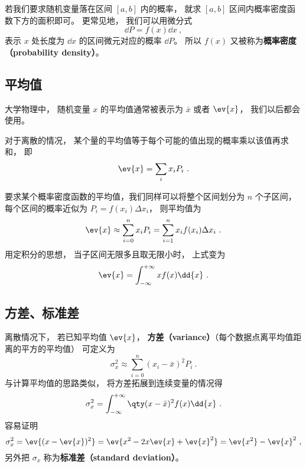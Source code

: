 若我们要求随机变量落在区间 $[a,b]$ 内的概率， 就求 $[a,b]$ 区间内概率密度函数下方的面积即可。 更常见地， 我们可以用微分式
\begin{equation}
\dd{P} = f(x) \dd{x}~,
\end{equation}
表示 $x$ 处长度为 $\dd{x}$ 的区间微元对应的概率 $\dd{P}$。 所以 $f(x)$ 又被称为\textbf{概率密度（probability density）}。

\subsection{平均值}
大学物理中， 随机变量 $x$ 的平均值通常被表示为 $\bar x$ 或者 $\ev{x}$， 我们以后都会使用。

对于离散的情况， 某个量的平均值等于每个可能的值出现的概率乘以该值再求和， 即
\begin{equation}\label{eq_RandF_14}
\ev{x} = \sum_i x_i P_i~.
\end{equation}

要求某个概率密度函数的平均值，我们同样可以将整个区间划分为 $n$ 个子区间， 每个区间的概率近似为 $P_i = f(x_i) \Delta x_i$， 则平均值为
\begin{equation}
\ev{x} \approx \sum_{i=0}^n x_i P_i = \sum_{i=1}^n x_i f(x_i) \Delta x_i~.
\end{equation}
用定积分的思想， 当子区间无限多且取无限小时， 上式变为
\begin{equation}\label{eq_RandF_7}
\ev{x} = \int_{-\infty}^{+\infty} x f(x) \dd{x}~.
\end{equation}

\subsection{方差、标准差}
离散情况下， 若已知平均值 $\ev{x}$， \textbf{方差（variance）}（每个数据点离平均值距离的平方的平均值） 可定义为
\begin{equation}
\sigma_x^2 \approx \sum_{i=0}^n (x_i - \bar x)^2 P_i~.
\end{equation}
与计算平均值的思路类似， 将方差拓展到连续变量的情况得
\begin{equation}\label{eq_RandF_6}
\sigma_x^2 = \int_{-\infty}^{+\infty} \qty(x-\bar x)^2 f(x) \dd{x}~.
\end{equation}
容易证明
\begin{equation}\label{eq_RandF_15}
\sigma_x^2=\ev{(x-\ev{x})^2}=\ev{x^2-2x\ev{x}+\ev{x}^2}=\ev{x^2}-\ev{x}^2~,
\end{equation}
另外把 $\sigma_x$ 称为\textbf{标准差（standard deviation）}。

